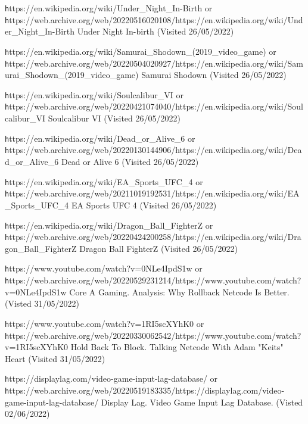 \documentclass{entcs}
\begin{document}
\begin{thebibliography}{25}
 {\texttt https://en.wikipedia.org/wiki/Under\_Night\_In-Birth} or {\texttt https://web.archive.org/web/20220516020108/https://en.wikipedia.org/wiki/Under\_Night\_In-Birth} Under Night In-birth (Visited 26/05/2022)

 {\texttt https://en.wikipedia.org/wiki/Samurai\_Shodown\_(2019\_video\_game)} or {\texttt https://web.archive.org/web/20220504020927/https://en.wikipedia.org/wiki/Samurai\_Shodown\_(2019\_video\_game)} Samurai Shodown (Visited 26/05/2022)

 {\texttt https://en.wikipedia.org/wiki/Soulcalibur\_VI} or {\texttt https://web.archive.org/web/20220421074040/https://en.wikipedia.org/wiki/Soulcalibur\_VI} Soulcalibur VI (Visited 26/05/2022)

 {\texttt https://en.wikipedia.org/wiki/Dead\_or\_Alive\_6} or {\texttt https://web.archive.org/web/20220130144906/https://en.wikipedia.org/wiki/Dead\_or\_Alive\_6} Dead or Alive 6 (Visited 26/05/2022)

 {\texttt https://en.wikipedia.org/wiki/EA\_Sports\_UFC\_4} or {\texttt https://web.archive.org/web/20211019192531/https://en.wikipedia.org/wiki/EA\_Sports\_UFC\_4} EA Sports UFC 4 (Visited 26/05/2022)

 {\texttt https://en.wikipedia.org/wiki/Dragon\_Ball\_FighterZ} or {\texttt https://web.archive.org/web/20220424200258/https://en.wikipedia.org/wiki/Dragon\_Ball\_FighterZ} Dragon Ball FighterZ (Visited 26/05/2022)

 {\texttt https://www.youtube.com/watch?v=0NLe4IpdS1w} or {\texttt https://web.archive.org/web/20220529231214/https://www.youtube.com/watch?v=0NLe4IpdS1w} Core A Gaming. Analysis: Why Rollback Netcode Is Better. (Visted 31/05/2022)

 {\texttt https://www.youtube.com/watch?v=1RI5scXYhK0} or {\texttt https://web.archive.org/web/20220330062542/https://www.youtube.com/watch?v=1RI5scXYhK0} Hold Back To Block. Talking Netcode With Adam "Keits" Heart (Visited 31/05/2022)

 {\texttt https://displaylag.com/video-game-input-lag-database/} or {\texttt https://web.archive.org/web/20220519183335/https://displaylag.com/video-game-input-lag-database/} Display Lag. Video Game Input Lag Database. (Visted 02/06/2022)

\end{thebibliography}
\end{document}
